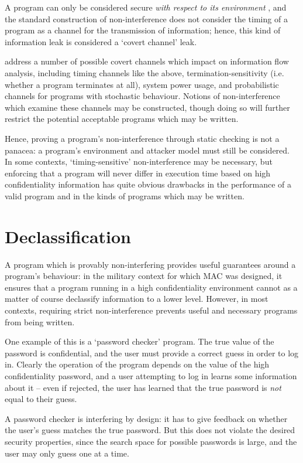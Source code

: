 A program can only be considered secure \textit{with respect to its environment} \cite{sabelfeld2003if}, and the standard construction of non-interference does not consider the timing of a program as a channel for the transmission of information; hence, this kind of information leak is considered a `covert channel' leak.

\citeauthor{sabelfeld2003if} \cite{sabelfeld2003if} address a number of possible covert channels which impact on information flow analysis, including timing channels like the above, termination-sensitivity (i.e. whether a program terminates at all), system power usage, and probabilistic channels for programs with stochastic behaviour. Notions of non-interference which examine these channels may be constructed, though doing so will further restrict the potential acceptable programs which may be written.

Hence, proving a program's non-interference through static checking is not a panacea: a program's environment and attacker model must still be considered. In some contexts, `timing-sensitive' non-interference may be necessary, but enforcing that a program will never differ in execution time based on high confidentiality information has quite obvious drawbacks in the performance of a valid program and in the kinds of programs which may be written.

\section{Declassification}

A program which is provably non-interfering provides useful guarantees around a program's behaviour: in the military context for which MAC was designed, it ensures that a program running in a high confidentiality environment cannot as a matter of course declassify information to a lower level. However, in most contexts, requiring strict non-interference prevents useful and necessary programs from being written.

One example of this is a `password checker' program. The true value of the password is confidential, and the user must provide a correct guess in order to log in. Clearly the operation of the program depends on the value of the high confidentiality password, and a user attempting to log in learns some information about it -- even if rejected, the user has learned that the true password is \textit{not} equal to their guess.

A password checker is interfering by design: it has to give feedback on whether the user's guess matches the true password. But this does not violate the desired security properties, since the search space for possible passwords is large, and the user may only guess one at a time.

